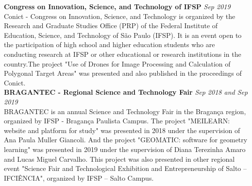 \documentclass[a4paper,10pt]{article}
\begin{document}
\noindent\textbf{Congress on Innovation, Science, and Technology of IFSP} \hfill \textit{Sep 2019}\\
Conict - Congress on Innovation, Science, and Technology is organized by the Research and Graduate Studies Office (PRP) of the Federal Institute of Education, Science, and Technology of São Paulo (IFSP). It is an event open to the participation of high school and higher education students who are conducting research at IFSP or other educational or research institutions in the country.The project "Use of Drones for Image Processing and Calculation of Polygonal Target Areas" was presented and also published in the proceedings of Conict. \\

\noindent\textbf{BRAGANTEC - Regional Science and Technology Fair} \hfill \textit{Sep 2018 and Sep 2019}\\
BRAGANTEC is an annual Science and Technology Fair in the Bragança region, organized by IFSP - Bragança Paulista Campus. The project "MEILEARN: website and platform for study" was presented in 2018 under the supervision of Ana Paula Muller Giancoli. And the project "GEOMATIC: software for geometry learning" was presented in 2019 under the supervision of Diana Terezinha Amaro and Lucas Miguel Carvalho. This project was also presented in other regional event "Science Fair and Technological Exhibition and Entrepreneurship of Salto – IFCIÊNCIA", organized by IFSP – Salto Campus.
%


\end{document}
